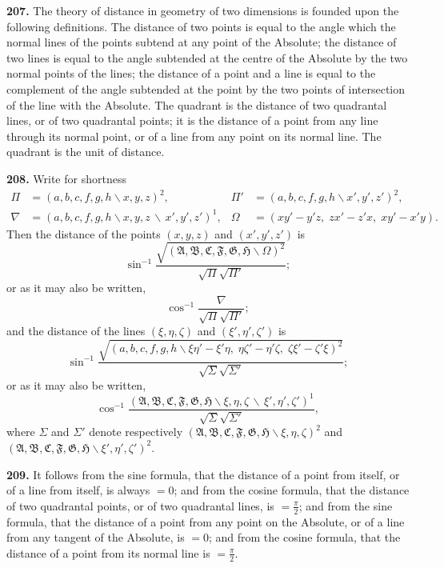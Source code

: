 \documentclass[11pt,a4paper]{article}
\begin{document}
\textbf{207.} The theory of distance in geometry of two dimensions is founded upon the
following definitions. The distance of two points is equal to the angle which the
normal lines of the points subtend at any point of the Absolute; the distance of two
lines is equal to the angle subtended at the centre of the Absolute by the two normal
points of the lines; the distance of a point and a line is equal to the complement of
the angle subtended at the point by the two points of intersection of the line with
the Absolute. The quadrant is the distance of two quadrantal lines, or of two
quadrantal points; it is the distance of a point from any line through its normal point,
or of a line from any point on its normal line. The quadrant is the unit of distance.

\textbf{208.} Write for shortness
\begin{align*}
\Pi &= (a,b,c,f,g,h\!\backslash x,y,z)^2, & \Pi' &= (a,b,c,f,g,h\!\backslash x',y',z')^2,\\
\nabla &= (a,b,c,f,g,h\!\backslash x,y,z\,\backslash\,x',y',z')^1, & \Omega &= (xy'-y'z,\; zx'-z'x,\; xy'-x'y).
\end{align*}
Then the distance of the points $(x,y,z)$ and $(x',y',z')$ is
\[
\sin^{-1}\frac{\sqrt{(\mathfrak{A},\mathfrak{B},\mathfrak{C},\mathfrak{F},\mathfrak{G},\mathfrak{H}\!\backslash \Omega)^2}}{\sqrt{\Pi}\sqrt{\Pi'}};
\]
or as it may also be written,
\[
\cos^{-1}\frac{\nabla}{\sqrt{\Pi}\sqrt{\Pi'}};
\]
and the distance of the lines $(\xi,\eta,\zeta)$ and $(\xi',\eta',\zeta')$ is
\[
\sin^{-1}\frac{\sqrt{(a,b,c,f,g,h\!\backslash \xi\eta'-\xi'\eta,\; \eta\zeta'-\eta'\zeta,\; \zeta\xi'-\zeta'\xi)^2}}{\sqrt{\Sigma}\sqrt{\Sigma'}};
\]
or as it may also be written,
\[
\cos^{-1}\frac{(\mathfrak{A},\mathfrak{B},\mathfrak{C},\mathfrak{F},\mathfrak{G},\mathfrak{H}\!\backslash \xi,\eta,\zeta\,\backslash\,\xi',\eta',\zeta')^1}{\sqrt{\Sigma}\sqrt{\Sigma'}},
\]
where $\Sigma$ and $\Sigma'$ denote respectively $(\mathfrak{A},\mathfrak{B},\mathfrak{C},\mathfrak{F},\mathfrak{G},\mathfrak{H}\!\backslash \xi,\eta,\zeta)^2$ and
$(\mathfrak{A},\mathfrak{B},\mathfrak{C},\mathfrak{F},\mathfrak{G},\mathfrak{H}\!\backslash \xi',\eta',\zeta')^2$.

\textbf{209.} It follows from the sine formula, that the distance of a point from itself,
or of a line from itself, is always $=0$; and from the cosine formula, that the distance
of two quadrantal points, or of two quadrantal lines, is $=\frac{\pi}{2}$; and from the sine formula,
that the distance of a point from any point on the Absolute, or of a line from any
tangent of the Absolute, is $=0$; and from the cosine formula, that the distance of a
point from its normal line is $=\frac{\pi}{2}$.
\end{document}
